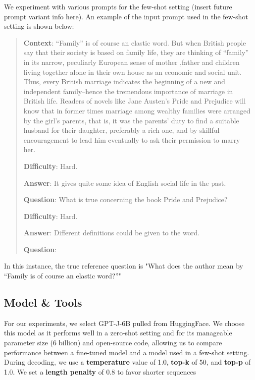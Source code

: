 \documentclass[11pt]{article}
\begin{document}
We experiment with various prompts for the few-shot setting (insert future prompt variant info here). An example of the input prompt used in the few-shot setting is shown below: 

\begin{small}

\begin{quote}
\textbf{Context}: ``Family'' is of course an elastic word. But when British people say that their society is based on family life, they are thinking of ``family'' in its narrow, peculiarly European sense of mother ,father and children living together alone in their own house as an economic and social unit. Thus, every British marriage indicates the beginning of a new and independent family--hence the tremendous importance of marriage in British life. Readers of novels like Jane Austen's Pride and Prejudice will know that in former times marriage among wealthy families were arranged by the girl's parents, that is, it was the parents' duty to find a suitable husband for their daughter, preferably a rich one, and by skillful encouragement to lead him eventually to ask their permission to marry her. 

\textbf{Difficulty}: Hard. 

\textbf{Answer}: It gives quite some idea of English social life in the past.

\textbf{Question}: What is true concerning the book Pride and Prejudice?

\textbf{Difficulty}: Hard. 

\textbf{Answer}: Different definitions could be given to the word.

\textbf{Question}: 

\end{quote}

\end{small}


In this instance, the true reference question is "What does the author mean by ``Family is of course an elastic word?''"

\subsection{Model \& Tools}

For our experiments, we select GPT-J-6B \citep{gpt-j:4} pulled from HuggingFace. We choose this model as it performs well in a zero-shot setting \citep{gpt-j:4} and for its manageable parameter size (6 billion) and open-source code, allowing us to compare performance between a fine-tuned model and a model used in a few-shot setting. During decoding, we use a \textbf{temperature} value of 1.0, \textbf{top-k} of 50, and \textbf{top-p} of 1.0. We set a \textbf{length penalty} of 0.8 to favor shorter sequences
\end{document}
